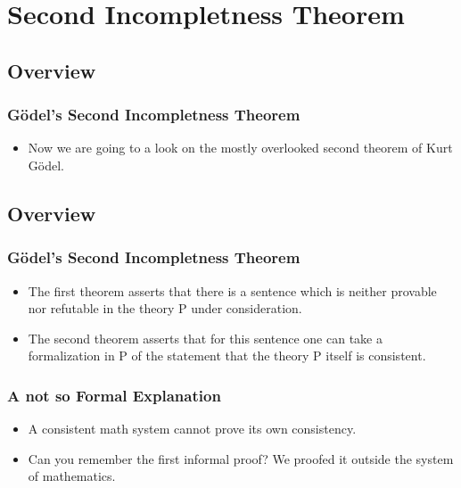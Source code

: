 \documentclass[aspectratio=169]{beamer}
\begin{document}
\section{Second Incompletness Theorem}
\subsection{Overview}
\begin{frame}
	\frametitle{Gödel's Second Incompletness Theorem}
	\begin{itemize}
		\item Now we are going to a look on the mostly overlooked second theorem of Kurt Gödel.
	\end{itemize}
\end{frame}

\subsection{Overview}
\begin{frame}
	\frametitle{Gödel's Second Incompletness Theorem}
	\begin{itemize}
		\item The first theorem asserts that there is a sentence which is neither provable nor refutable in the theory P under consideration.
		\item The second theorem asserts that for this sentence one can take a formalization in P of the statement that the theory P itself is consistent.
	\end{itemize}
\end{frame}

\begin{frame}
	\frametitle{A not so Formal Explanation}
	\begin{itemize}
		\item A consistent math system cannot prove its own consistency.
		\item Can you remember the first informal proof? We proofed it outside the system of mathematics.
		\hyperlink{important}{}
	\end{itemize}
\end{frame}
\end{document}
